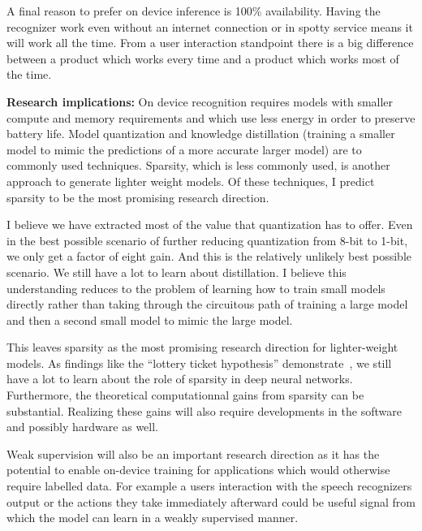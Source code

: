 A final reason to prefer on device inference is 100\% availability. Having the
recognizer work even without an internet connection or in spotty service means
it will work all the time. From a user interaction standpoint there is a big
difference between a product which works every time and a product which works
most of the time.

{\bf Research implications:} On device recognition requires models with smaller
compute and memory requirements and which use less energy in order to preserve
battery life. Model quantization and knowledge distillation (training a smaller
model to mimic the predictions of a more accurate larger model) are to commonly
used techniques. Sparsity, which is less commonly used, is another approach to
generate lighter weight models. Of these techniques, I predict sparsity to be
the most promising research direction.

I believe we have extracted most of the value that quantization has to offer.
Even in the best possible scenario of further reducing quantization from 8-bit
to 1-bit, we only get a factor of eight gain. And this is the relatively
unlikely best possible scenario. We still have a lot to learn about
distillation. I believe this understanding reduces to the problem of learning
how to train small models directly rather than taking through the circuitous
path of training a large model and then a second small model to mimic the large
model.

This leaves sparsity as the most promising research direction for
lighter-weight models. As findings like the ``lottery ticket hypothesis''
demonstrate~\citep{frankle2018lottery}, we still have a lot to learn about the
role of sparsity in deep neural networks. Furthermore, the theoretical
computationnal gains from sparsity can be substantial. Realizing these gains
will also require developments in the software and possibly hardware as well.

Weak supervision will also be an important research direction as it has the
potential to enable on-device training for applications which would otherwise
require labelled data. For example a users interaction with the speech
recognizers output or the actions they take immediately afterward could be
useful signal from which the model can learn in a weakly supervised manner.

